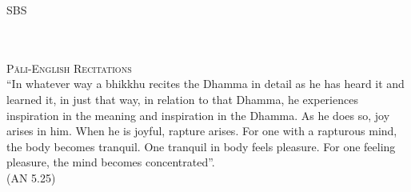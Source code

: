 \cleartorecto
\thispagestyle{empty}
\vspace*{3em}

{\centering


  {\Huge\fontsize{64}{16}\sbsFont SBS}\\[1.0\baselineskip]%

  {\Huge\chapterTitleFont\textsc{{\thesubtitle\linebreak}}}\\[0.2\baselineskip]

  \\[1.4\baselineskip]

  {\Large\scshape Pāli-English Recitations}\\[2.5\baselineskip]

  {\quote ``In whatever way a bhikkhu recites the Dhamma in detail as he has heard it and learned it, in just that way, in relation to that Dhamma, he experiences inspiration in the meaning and inspiration in the Dhamma. As he does so, joy arises in him. When he is joyful, rapture arises. For one with a rapturous mind, the body becomes tranquil. One tranquil in body feels pleasure. For one feeling pleasure, the mind becomes concentrated''.\\ \smallskip (AN 5.25)}\\[1.4\baselineskip]
}
